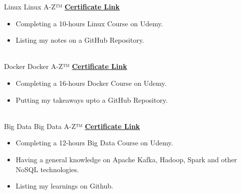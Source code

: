 \documentclass[letterpaper]{DS_class_file} %
\begin{document}
\begin{twenty} %
	\twentyitem
	{Linux}
	{}
	{\hspace{0.3cm}Linux A-Z™}
	{\href{https://www.udemy.com/certificate/UC-74719d94-89af-44ba-ab2d-4299dd2ec3dd/}{\textbf{Certificate Link}}}
	{}
	{
		{\begin{itemize}
				\item Completing a 10-hours Linux Course on Udemy.
				\item Listing my notes on a GitHub Repository.
		\end{itemize}}
	}
	\\
	\twentyitem
	{Docker}
	{}
	{\hspace{0.3cm}Docker A-Z™}
	{\href{https://www.udemy.com/certificate/UC-c1ab98de-9803-452b-9166-8ef3ae797e5a/}{\textbf{Certificate Link}}}
	{}
	{
		{\begin{itemize}
				\item Completing a 16-hours Docker Course on Udemy.
				\item Putting my takeaways upto a GitHub Repository.
		\end{itemize}}
	}
	\\
	\twentyitem
	{Big Data}
	{}
	{\hspace{0.3cm}Big Data A-Z™}
	{\href{https://www.udemy.com/certificate/UC-4a851250-cc99-4a9d-8f7c-d8a32ed0a832/}{\textbf{Certificate Link}}}
	{}
	{
		{\begin{itemize}
				\item Completing a 12-hours Big Data Course on Udemy.
				\item Having a general knowledge on Apache Kafka, Hadoop, Spark and other NoSQL technologies.
				\item Listing my learnings on Github.
		\end{itemize}}
	}
	\\

	
\end{twenty}



	
\end{document}
